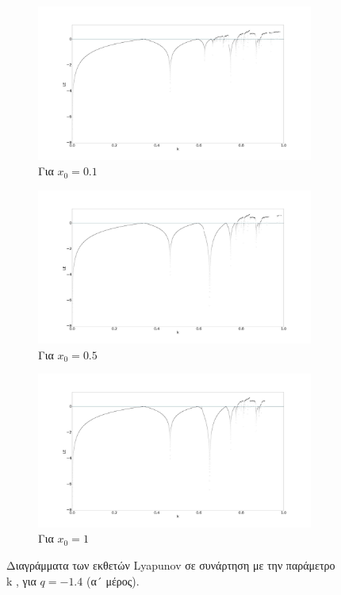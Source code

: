 \begin{figure}[ht]
	\centering
	\begin{subfigure}[b]{0.7\textwidth}
		\centering
		\includegraphics[width=\textwidth]{LateX images/graphs q16/g7}
		\caption{Για \(x_0=0.1\)}
		\label{f:g33}
	\end{subfigure}
	\hfill
	\begin{subfigure}[b]{0.7\textwidth}
		\centering
		\includegraphics[width=\textwidth]{LateX images/graphs q16/g8}
		\caption{Για \(x_0=0.5\)}
		\label{f:g34}
	\end{subfigure}
	\hfill
	\begin{subfigure}[b]{0.7\textwidth}
		\centering
		\includegraphics[width=\textwidth]{LateX images/graphs q16/g9}
		\caption{Για \(x_0=1\)}
		\label{f:g35}
	\end{subfigure}
	
	\caption{Διαγράμματα των εκθετών Lyapunov σε συνάρτηση με την παράμετρο k , για  $q=-1.4$ (α´ μέρος).}
\end{figure}

